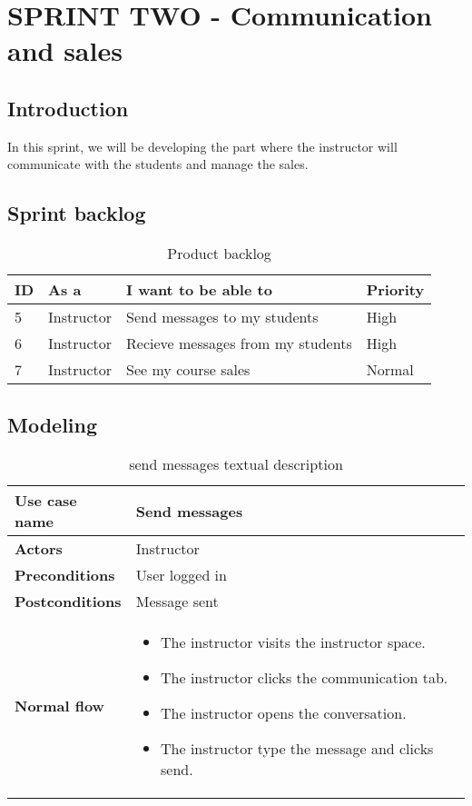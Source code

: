\chapter{SPRINT TWO - Communication and sales}
\newpage
\section*{Introduction}
In this sprint, we will be developing the part where the instructor will communicate with the students and manage the sales.
\section{Sprint backlog}
\begin{table}[H]
\centering
\caption{Product backlog}
\begin{tabular}{|p{1cm}|p{3cm}|p{6cm}|p{2cm}|}
\hline
\rowcolor{brown!18}\textbf{\large{ID}} & \textbf{\large{As a}} & \textbf{\large{I want to be able to}} & \textbf{\large{Priority}} \\
\hline
5& Instructor & Send messages to my students & High\\\hline
6& Instructor & Recieve messages from my students  & High\\\hline
7& Instructor  & See my course sales & Normal \\\hline
\end{tabular}
\end{table}


\section{Modeling}

\begin{table}[H]
\centering
\caption{send messages textual description}
\begin{tabular}{|p{4cm}|p{10cm}|}
\hline
\textbf{\large{Use case name}} & Send messages \\\hline
\textbf{\large{Actors}} & Instructor \\\hline
\textbf{\large{Preconditions}} & User logged in \\\hline
\textbf{\large{Postconditions}} & Message sent  \\\hline
\textbf{\large{Normal flow}} & 
\begin{itemize}
  \item The instructor visits the instructor space.
  \item The instructor clicks the communication tab.
  \item The instructor opens the conversation.
  \item The instructor type the message and clicks send.
\end{itemize}
\\\hline

\end{tabular}
\end{table}


